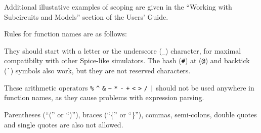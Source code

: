 \begin{Command}
Additional illustative examples of scoping are given in the
``Working with Subcircuits and Models'' section of the \Xyce{} Users'
Guide\UsersGuide.

Rules for function names are as follows:
\begin{XyceItemize}
\item They should start with a letter or the underscore (\verb|_|) character,
for maximal compatibilty with other Spice-like simulators.  The hash (\verb|#|)
at (\verb|@|) and backtick (\verb|`|) symbols also work, but they are not
reserved characters.
\item These arithmetic operators \verb|%| \verb|^| \verb|&| \verb|~|
\verb|*| \verb|-| \verb|+| \verb|<| \verb|>| \verb|/| \verb+|+ should not
be used anywhere in function names, as they cause problems with expression
parsing.
\item Parentheses (``('' or ``)''), braces (``\{'' or ``\}''), commas,
semi-colons, double quotes and single quotes are also not allowed.
\end{XyceItemize}

\end{Command}

